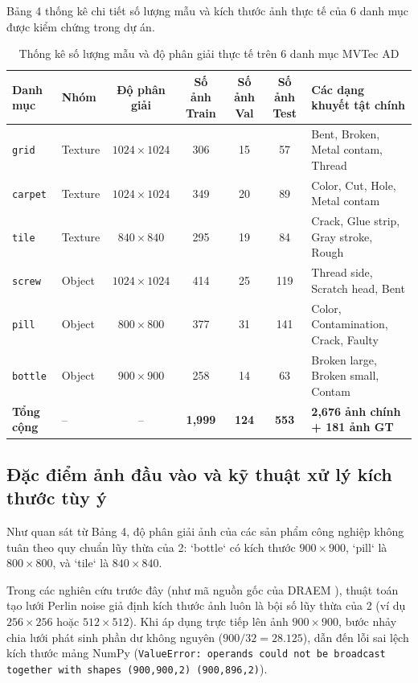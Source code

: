 Bảng 4 thống kê chi tiết số lượng mẫu và kích thước ảnh thực tế của 6 danh mục được kiểm chứng trong dự án.

\begin{table}[h]
\centering
\caption{Thống kê số lượng mẫu và độ phân giải thực tế trên 6 danh mục MVTec AD}
\label{tab:mvtec_stats}
\begin{tabularx}{\textwidth}{l l c c c c X}
\toprule
\textbf{Danh mục} & \textbf{Nhóm} & \textbf{Độ phân giải} & \textbf{Số ảnh Train} & \textbf{Số ảnh Val} & \textbf{Số ảnh Test} & \textbf{Các dạng khuyết tật chính} \\
\midrule
\texttt{grid} & Texture & $1024 \times 1024$ & 306 & 15 & 57 & Bent, Broken, Metal contam, Thread \\
\texttt{carpet} & Texture & $1024 \times 1024$ & 349 & 20 & 89 & Color, Cut, Hole, Metal contam \\
\texttt{tile} & Texture & $840 \times 840$ & 295 & 19 & 84 & Crack, Glue strip, Gray stroke, Rough \\
\texttt{screw} & Object & $1024 \times 1024$ & 414 & 25 & 119 & Thread side, Scratch head, Bent \\
\texttt{pill} & Object & $800 \times 800$ & 377 & 31 & 141 & Color, Contamination, Crack, Faulty \\
\texttt{bottle} & Object & $900 \times 900$ & 258 & 14 & 63 & Broken large, Broken small, Contam \\
\midrule
\textbf{Tổng cộng} & -- & -- & \textbf{1,999} & \textbf{124} & \textbf{553} & \textbf{2,676 ảnh chính + 181 ảnh GT} \\
\bottomrule
\end{tabularx}
\end{table}

\subsection{Đặc điểm ảnh đầu vào và kỹ thuật xử lý kích thước tùy ý}

Như quan sát từ Bảng 4, độ phân giải ảnh của các sản phẩm công nghiệp không tuân theo quy chuẩn lũy thừa của 2: `bottle` có kích thước $900 \times 900$, `pill` là $800 \times 800$, và `tile` là $840 \times 840$. 

Trong các nghiên cứu trước đây (như mã nguồn gốc của DRAEM \cite{zavrtanik2021}), thuật toán tạo lưới Perlin noise giả định kích thước ảnh luôn là bội số lũy thừa của 2 (ví dụ $256 \times 256$ hoặc $512 \times 512$). Khi áp dụng trực tiếp lên ảnh $900 \times 900$, bước nhảy chia lưới phát sinh phần dư không nguyên ($900 / 32 = 28.125$), dẫn đến lỗi sai lệch kích thước mảng NumPy (\texttt{ValueError: operands could not be broadcast together with shapes (900,900,2) (900,896,2)}).

